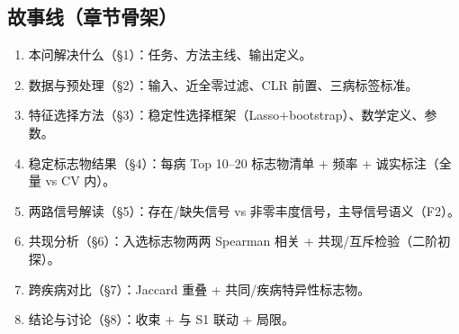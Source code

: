 \documentclass{internal-report}
\begin{document}
\subsection{故事线（章节骨架）}
\begin{enumerate}
  \item 本问解决什么（§1）：任务、方法主线、输出定义。
  \item 数据与预处理（§2）：输入、近全零过滤、CLR 前置、三病标签标准。
  \item 特征选择方法（§3）：稳定性选择框架（Lasso+bootstrap）、数学定义、参数。
  \item 稳定标志物结果（§4）：每病 Top 10--20 标志物清单 + 频率 + 诚实标注（全量 vs CV 内）。
  \item 两路信号解读（§5）：存在/缺失信号 vs 非零丰度信号，主导信号语义（F2）。
  \item 共现分析（§6）：入选标志物两两 Spearman 相关 + 共现/互斥检验（二阶初探）。
  \item 跨疾病对比（§7）：Jaccard 重叠 + 共同/疾病特异性标志物。
  \item 结论与讨论（§8）：收束 + 与 S1 联动 + 局限。
\end{enumerate}
\end{document}
